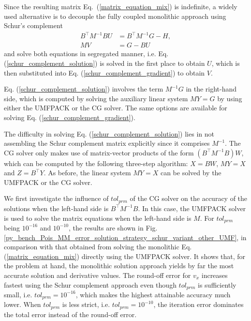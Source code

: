 \documentclass[review,3p]{elsarticle}
\begin{document}
Since the resulting matrix Eq.~(\ref{matrix_equation_mix}) is indefinite, a widely used alternative is to decouple the fully coupled monolithic approach using Schur's complement
\begin{subequations}
 \begin{align}
  B^{\top} M^{-1} B U &= B^{\top} M^{-1} G - H, 	\label{schur_complement_solution} \\
  MV&=G-BU						\label{schur_complement_gradient}
\end{align}						\label{schur_complement_block}%
\end{subequations}
and solve both equations in segregated manner, i.e. Eq. (\ref{schur_complement_solution}) is solved in the first place to obtain $U$, which is then substituted into Eq. (\ref{schur_complement_gradient}) to obtain $V$.

Eq. (\ref{schur_complement_solution}) involves the term $M^{-1} G$ in the right-hand side, which is computed by solving the auxiliary linear system $MY=G$ by using either the UMFPACK or the CG solver. The same options are available for solving Eq. (\ref{schur_complement_gradient}). 

The difficulty in solving Eq. (\ref{schur_complement_solution}) lies in not assembling the Schur complement matrix explicitly since it comprises $M^{-1}$. 
The CG solver only makes use of matrix-vector products of the form $(B^{\top}M^{-1}B)W$, which can be computed by the following three-step algorithm: $X=BW$, $MY=X$ and $Z=B^{\top}Y$. As before, the linear system $MY=X$ can be solved by the UMFPACK or the CG solver.

We first investigate the influence of $tol_{prm}$ of the CG solver on the accuracy of the solutions when the left-hand side is $B^{\top}M^{-1}B$. In this case, the UMFPACK solver is used to solve the matrix equations when the left-hand side is $M$.  
For $tol_{prm}$ being $10^{-16}$ and $10^{-10}$, the results are shown in Fig. \ref{py_bench_Pois_MM_error_solution_strategy_schur_variant_other_UMF}, in comparison with that obtained from solving the monolithic Eq. (\ref{matrix_equation_mix}) directly using the UMFPACK solver.
It shows that, for the problem at hand, the monolithic solution approach yields by far the most accurate solution and derivative values. The round-off error for $v_{x}$ increases fastest using the Schur complement approach even though $tol_{prm}$ is sufficiently small, i.e. $tol_{prm}=10^{-16}$, which makes the highest attainable accuracy much lower.
When $tol_{prm}$ is less strict, i.e. $tol_{prm}=10^{-10}$, the iteration error dominates the total error instead of the round-off error.
\end{document}
